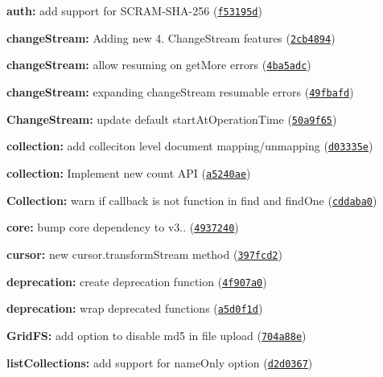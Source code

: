 \begin{DoxyItemize}
\item {\bfseries auth\+:} add support for S\+C\+R\+A\+M-\/\+S\+H\+A-\/256 (\href{https://github.com/mongodb/node-mongodb-native/commit/f53195d}{\tt f53195d})
\item {\bfseries change\+Stream\+:} Adding new 4. Change\+Stream features (\href{https://github.com/mongodb/node-mongodb-native/commit/2cb4894}{\tt 2cb4894})
\item {\bfseries change\+Stream\+:} allow resuming on get\+More errors (\href{https://github.com/mongodb/node-mongodb-native/commit/4ba5adc}{\tt 4ba5adc})
\item {\bfseries change\+Stream\+:} expanding change\+Stream resumable errors (\href{https://github.com/mongodb/node-mongodb-native/commit/49fbafd}{\tt 49fbafd})
\item {\bfseries Change\+Stream\+:} update default start\+At\+Operation\+Time (\href{https://github.com/mongodb/node-mongodb-native/commit/50a9f65}{\tt 50a9f65})
\item {\bfseries collection\+:} add colleciton level document mapping/unmapping (\href{https://github.com/mongodb/node-mongodb-native/commit/d03335e}{\tt d03335e})
\item {\bfseries collection\+:} Implement new count A\+PI (\href{https://github.com/mongodb/node-mongodb-native/commit/a5240ae}{\tt a5240ae})
\item {\bfseries Collection\+:} warn if callback is not function in find and find\+One (\href{https://github.com/mongodb/node-mongodb-native/commit/cddaba0}{\tt cddaba0})
\item {\bfseries core\+:} bump core dependency to v3.. (\href{https://github.com/mongodb/node-mongodb-native/commit/4937240}{\tt 4937240})
\item {\bfseries cursor\+:} new cursor.\+transform\+Stream method (\href{https://github.com/mongodb/node-mongodb-native/commit/397fcd2}{\tt 397fcd2})
\item {\bfseries deprecation\+:} create deprecation function (\href{https://github.com/mongodb/node-mongodb-native/commit/4f907a0}{\tt 4f907a0})
\item {\bfseries deprecation\+:} wrap deprecated functions (\href{https://github.com/mongodb/node-mongodb-native/commit/a5d0f1d}{\tt a5d0f1d})
\item {\bfseries Grid\+FS\+:} add option to disable md5 in file upload (\href{https://github.com/mongodb/node-mongodb-native/commit/704a88e}{\tt 704a88e})
\item {\bfseries list\+Collections\+:} add support for name\+Only option (\href{https://github.com/mongodb/node-mongodb-native/commit/d2d0367}{\tt d2d0367})

\end{DoxyItemize}
